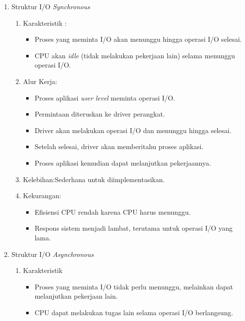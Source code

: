 \documentclass[12pt]{article}
\begin{document}
\begin{enumerate}
    \item Struktur I/O \emph{Synchronous} 
    \begin{enumerate}
        \item Karakteristik :
        \begin{itemize}
            \item Proses yang meminta I/O akan menunggu hingga operasi I/O selesai.
            \item CPU akan \emph{idle} (tidak melakukan pekerjaan lain) selama menunggu operasi I/O.
        \end{itemize}
        \item Alur Kerja:
        \begin{itemize}
            \item Proses aplikasi \emph{user level} meminta operasi I/O.
            \item Permintaan diteruskan ke driver perangkat.
            \item Driver akan melakukan operasi I/O dan menunggu hingga selesai.
            \item Setelah selesai, driver akan memberitahu proses aplikasi.
            \item Proses aplikasi kemudian dapat melanjutkan pekerjaannya.
        \end{itemize}
        \item Kelebihan:Sederhana untuk diimplementasikan.
        \item Kekurangan:
        \begin{itemize}
            \item Efisiensi CPU rendah karena CPU harus menunggu.
            \item Respons sistem menjadi lambat, terutama untuk operasi I/O yang lama.    
        \end{itemize}
    \end{enumerate}
    \item Struktur I/O \emph{Asynchronous}
    \begin{enumerate}
        \item Karakteristik
        \begin{itemize}
            \item Proses yang meminta I/O tidak perlu menunggu, melainkan dapat melanjutkan pekerjaan lain.
            \item CPU dapat melakukan tugas lain selama operasi I/O berlangsung.  
        \end{itemize}

\end{enumerate}
\end{enumerate}
\end{document}
